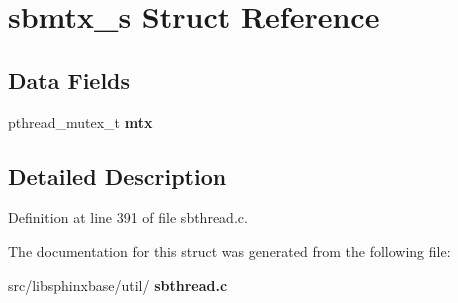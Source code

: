 \section{sbmtx\+\_\+s Struct Reference}
\label{structsbmtx__s}
\subsection*{Data Fields}
\begin{DoxyCompactItemize}
\item 
\mbox{\label{structsbmtx__s_ace878fba44a1313bef64565a10323640}} 
pthread\+\_\+mutex\+\_\+t {\bfseries mtx}
\end{DoxyCompactItemize}


\subsection{Detailed Description}


Definition at line 391 of file sbthread.\+c.



The documentation for this struct was generated from the following file\+:\begin{DoxyCompactItemize}
\item 
src/libsphinxbase/util/\textbf{ sbthread.\+c}\end{DoxyCompactItemize}
